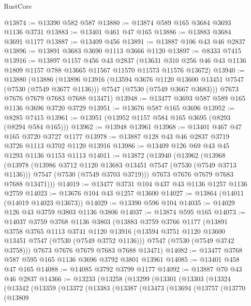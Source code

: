 \begin{lexlean}{RustCore}
\begin{coremodule}
@13874 := @13390 @582 @587
@13880 := @13874 @589 @165 @3684 @3693 @1136 @3731
@13883 := @13401 @461 @47 @165
@13886 := @13883 @3684 @3691 @1177
@13887 := @13409 @456
@13891 := @13887 @106 @43 @46 @2837
@13896 := @13891 @3683 @3690 @1113 @3666 @1120
@13897 := @8333 @7415
@13916 := @13897
    @1157
    @456
    @43
    @2837
    (@13631 @310 @256 @46 @43 @1136 @1809 @1157 @788 @13665 @11567 @11570 @11573 @11576 @13672)
@13940 := @13880
    (@13886
      (@13896
        @13916
        (@13594 @3676 @1120 @13600 @13451 @7547 (@7530 (@7549 @3677 @1136)))
        @7547
        (@7530 (@7549 @3667 @3683)))
      @7673
      @7676
      @7679
      @7683
      @7688
      @13471)
@13948 := @13477 @3693 @587 @589 @165 @1136 @3696 @3720 @3729
@13951 := @13676 @587 @165 @3696
@13952 := @8285 @7415
@13961 := @13951 (@13952 @1157 @584 @165 @3695 (@8293 (@8294 @584 @165)))
@13962 := @13948 @13961
@13968 := @13401 @467 @47 @165 @3720 @3727 @1177
@13978 := @13887 @128 @43 @46 @2837 @3719 @3726 @1113 @3702 @1120 @13916
@13986 := @13409 @126 @69 @43 @45 @1293 @1136 @1153 @1113
@14011 := @13872
    (@13940
      (@13962
        (@13968
          (@13978
            (@13986 @3712 @1120 @13683 @13451 @7547 (@7530 (@7549 @3713 @1136)))
            @7547
            (@7530 (@7549 @3703 @3719)))
          @7673
          @7676
          @7679
          @7683
          @7688
          @13471)))
@14019 := @13477 @3731 @104 @437 @43 @1136 @1257 @1136 @2759
@14023 := @13676 @104 @43 @1257 @13600
@14027 := @13864 (@14011 (@14019 @14023 @13673))
@14029 := @13390 @596 @104
@14035 := @14029 @126 @43 @3759 @3803 @1136 @3806
@14037 := @13874 @595 @165
@14073 := @14037
    @3759
    @3768
    @1136
    @3803
    (@13883
      @3759
      @3766
      @1177
      (@13891
        @3758
        @3765
        @1113
        @3741
        @1120
        @13916
        (@13594 @3751 @1120 @13600 @13451 @7547 (@7530 (@7549 @3752 @1136)))
        @7547
        (@7530 (@7549 @3742 @3758)))
      @7673
      @7676
      @7679
      @7683
      @7688
      @13471)
@14082 := @13477 @3768 @587 @595 @165 @1136 @3696 @3792 @3801 @13961
@14085 := @13401 @458 @47 @165
@14088 := @14085 @3792 @3799 @1177
@14092 := @13887 @70 @43 @46 @2837
@14366 := @13233
    (@13258
      (@13299
        (@13301
          (@13303
            (@13324
              (@13342
                (@13359
                  (@13372
                    (@13383
                      (@13387
                        (@13473
                          (@13694
                            (@13757
                              (@13770
                                (@13809

\end{coremodule}
\end{lexlean}
